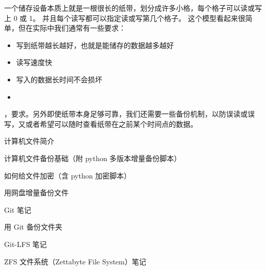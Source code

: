 
一个储存设备本质上就是一根很长的纸带，划分成许多小格，每个格子可以读或写上 0 或 1。 并且每个读写都可以指定读或写第几个格子。 这个模型看起来很简单，但在实际中我们通常有一些要求：
\begin{itemize}
\item 写到纸带越长越好，也就是能储存的数据越多越好
\item 读写速度快
\item 写入的数据长时间不会损坏
\item 
\end{itemize}

，要求。另外即使纸带本身足够可靠，我们还需要一些备份机制，以防误读或误写，又或者希望可以随时查看纸带在之前某个时间点的数据。

计算机文件简介

计算机文件备份基础（附 python 多版本增量备份脚本）

如何给文件加密（含 python 加密脚本）

用网盘增量备份文件

Git 笔记

用 Git 备份文件夹

Git-LFS 笔记

ZFS 文件系统（Zettabyte File System）笔记
